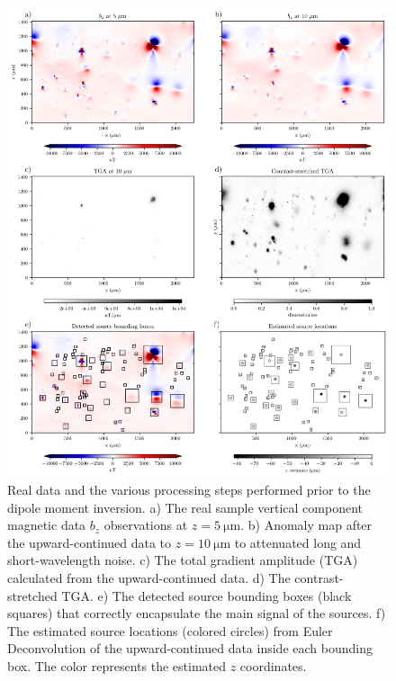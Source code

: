 \begin{figure}[tb!]
\centering
\includegraphics[width=1\linewidth]{figures/real-data.png}
\caption{Real data and the various processing steps performed prior to the dipole moment inversion.
    a) The real sample vertical component magnetic data $b_z$ observations at
    $z = \qty{5}{\um}$.
    b) Anomaly map after the upward-continued data to $z = \qty{10}{\um}$ to attenuated long and short-wavelength noise.
    c) The total gradient amplitude (TGA) calculated from the
    upward-continued data.
    d) The contrast-stretched TGA.
    e) The detected source bounding boxes (black squares) that correctly
    encapsulate the main signal of the sources.
    f) The estimated source locations (colored circles) from Euler
    Deconvolution of the upward-continued data inside each bounding box.
    The color represents the estimated $z$ coordinates.
  }
\label{real-data}
\end{figure}

